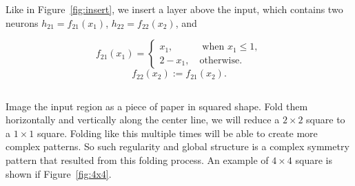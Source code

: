 Like in Figure~\ref{fig:insert},
we insert a layer above the input,
which contains two neurons
$h_{21}=f_{21}(x_1)$,
$h_{22}=f_{22}(x_2)$, and

\begin{equation}
    f_{21}(x_1) = \begin{cases}
            x_1, \quad\quad\quad \text{when }x_1\le 1, \\
            2-x_1, \quad \text{otherwise}.
        \end{cases}
\end{equation}
\begin{equation}
    f_{22}(x_2) := f_{21}(x_2).
\end{equation}

\subsection{} %

Image the input region as a piece of paper in squared shape.
Fold them horizontally and vertically along the center line,
we will reduce a $2\times 2$ square to a $1\times 1$ square.
Folding like this multiple times will be able to create more
complex patterns.
So such regularity and global structure is a complex symmetry pattern
that resulted from this folding process.
An example of $4\times 4$ square is shown if Figure~\ref{fig:4x4}.

\subsection{} %



